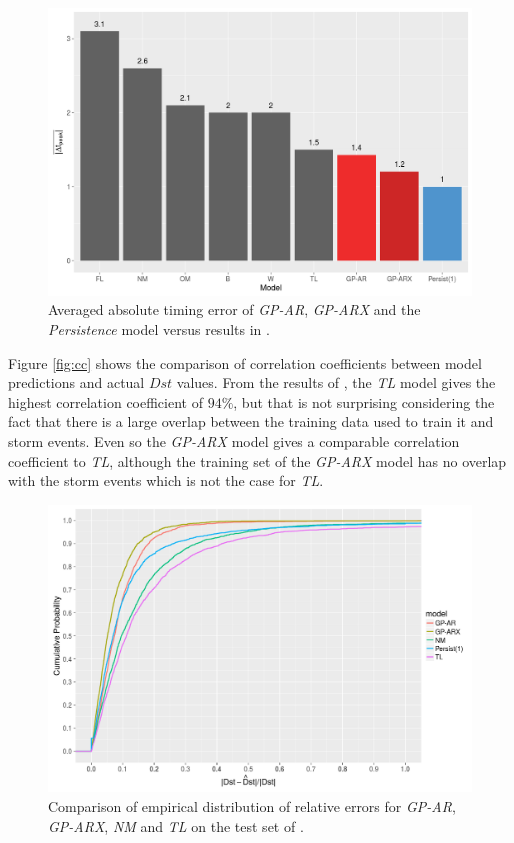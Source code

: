\documentclass[referee,a4paper,12pt,traditabstract]{swsc}
\begin{document}
\begin{linenumbers}
\begin{figure}
   \centering
   \includegraphics[width=\textwidth]{Compare_timingerr.png}
      \caption{Averaged absolute timing error of \emph{GP-AR}, \emph{GP-ARX} and the \emph{Persistence} model versus results in \citet{Ji2012}.}
         \label{fig:timingErr}
   \end{figure}

Figure \ref{fig:cc} shows the comparison of correlation coefficients between model predictions and actual $Dst$ values. From the results of \citet{Ji2012}, the \emph{TL} model gives the highest correlation coefficient of $94\%$, but that is not surprising considering the fact that there is a large overlap between the training data used to train it and storm events. Even so the \emph{GP-ARX} model gives a comparable correlation coefficient to \emph{TL}, although the training set of the \emph{GP-ARX} model has no overlap with the storm events which is not the case for \emph{TL}.

\begin{figure}
   \centering
   \includegraphics[width=\textwidth]{Compare_RelProb.png}
   \caption{Comparison of empirical distribution of relative errors for \emph{GP-AR}, \emph{GP-ARX}, \emph{NM} and \emph{TL} on the test set of \citet{Ji2012}.}
   \label{fig:relprob}
\end{figure}


\end{linenumbers}
\end{document}

